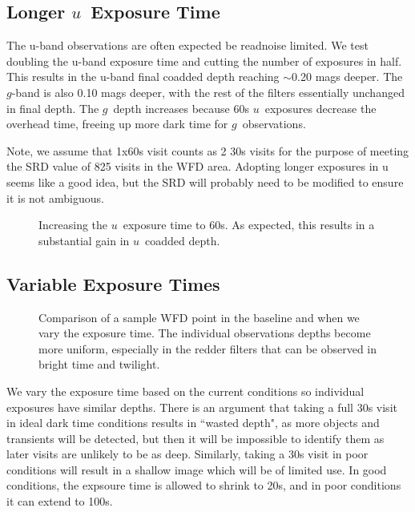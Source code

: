 \subsection{Longer $u$\ Exposure Time}\label{ss:u60}

The u-band observations are often expected be readnoise limited. We test doubling the u-band exposure time and cutting the number of exposures in half. This results in the u-band final coadded depth reaching $\sim$0.20 mags deeper. The $g$-band is also 0.10 mags deeper, with the rest of the filters essentially unchanged in final depth. The $g$\ depth increases because 60s $u$\ exposures decrease the overhead time, freeing up more dark time for $g$\ observations.

Note, we assume that 1x60s visit counts as 2 30s visits for the purpose of meeting the SRD value of 825 visits in the WFD area. Adopting longer exposures in u seems like a good idea, but the SRD will probably need to be modified to ensure it is not ambiguous.

\begin{figure}
\caption{Increasing the $u$\ exposure time to 60s.  As expected, this results in a substantial gain in $u$\ coadded depth.}
\end{figure}

\subsection{Variable Exposure Times}

\begin{figure}
\caption{Comparison of a sample WFD point in the baseline and when we vary the exposure time. The individual observations depths become more uniform, especially in the redder filters that can be observed in bright time and twilight.}\label{fig:varexptime}
\end{figure}

We vary the exposure time based on the current conditions so individual exposures have similar depths. There is an argument that taking a full 30s visit in ideal dark time conditions results in ``wasted depth", as more objects and transients will be detected, but then it will be impossible to identify them as later visits are unlikely to be as deep. Similarly, taking a 30s visit in poor conditions will result in a shallow image which will be of limited use. In good conditions, the expsoure time is allowed to shrink to 20s, and in poor conditions it can extend to 100s.

